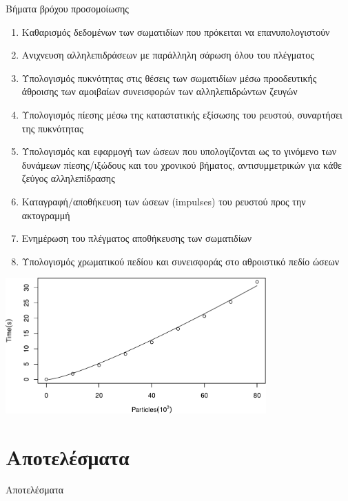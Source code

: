\documentclass[8pt,sans,mathserif,aspectratio=43]{beamer}
\newcommand{\eng}[1]{\selectlanguage{english}#1\selectlanguage{greek}}
\begin{document}
\begin{frame}{Βήματα βρόχου προσομοίωσης}
  \begin{enumerate}
  \item Καθαρισμός δεδομένων των σωματιδίων που πρόκειται να επανυπολογιστούν \pause
  \item Ανιχνευση αλληλεπιδράσεων με παράλληλη σάρωση όλου του πλέγματος \pause
  \item Υπολογισμός πυκνότητας στις θέσεις των σωματιδίων μέσω προοδευτικής άθροισης των
    αμοιβαίων συνεισφορών των αλληλεπιδρώντων ζευγών \pause
  \item Υπολογισμός πίεσης μέσω της καταστατικής εξίσωσης του ρευστού, συναρτήσει της
    πυκνότητας \pause
  \item Υπολογισμός και εφαρμογή των ώσεων που υπολογίζονται ως το γινόμενο των δυνάμεων
    πίεσης/ιξώδους και του χρονικού βήματος, αντισυμμετρικών για κάθε ζεύγος
    αλληλεπίδρασης \pause
  \item Καταγραφή/αποθήκευση των ώσεων (\eng{impulses}) του ρευστού προς την ακτογραμμή
    \pause
  \item Ενημέρωση του πλέγματος αποθήκευσης των σωματιδίων \pause
  \item Υπολογισμός χρωματικού πεδίου και συνεισφοράς στο αθροιστικό πεδίο ώσεων \pause
  \end{enumerate}
  \begin{center}
    \includegraphics[width=0.75\textwidth]{figures/performance.pdf}
  \end{center}
\end{frame}


\section{Αποτελέσματα}

\begin{frame}
  \begin{center}
    Αποτελέσματα
  \end{center}
\end{frame}
\end{document}
